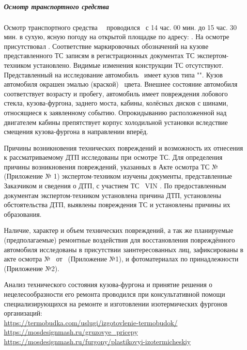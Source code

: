 \subparagraph*{Осмотр транспортного средства }
\noindent \begin{spacing}{1.2} { Осмотр транспортного средства \, \, проводился \osm\, с 14 час. 00 мин. до 15 час. 30 мин. в сухую, ясную погоду  на открытой площадке по адресу: . На осмотре присутствовал  .  %
Соответствие маркировочных обозначений на кузове представленного ТС записям в регистрационных документах ТС экс\-пертом-техником установлено. Видимые изменения конструкции ТС отсутствуют.  Представленный на исследование автомобиль \tc\, имеет кузов типа "". Кузов автомобиля окрашен %
эмалью (краской) \colr\, цвета.  Внешнее состояние автомобиля соответствует возрасту и пробегу, автомобиль имеет повреждения лобового стекла, кузова-фургона, заднего моста, кабины, колёсных дисков с шинами, относящиеся к заявленному событию.  Опрокидыванию расположенной над двигателем кабины  препятствует корпус холодильной установки вследствие смещения кузова-фургона в направлении вперёд.    %
\par Причины возникновения технических повреждений и возможность их отнесения к рассматриваемому ДТП исследованы при осмотре ТС. 
Для определения причины возникновения повреждений, указанных в Акте осмотра ТС 
№ \NomerDoc \, (Приложение № 1) экспертом-техником изучены документы, представленные Заказчиком и сведения о ДТП, с участием ТС  \, VIN  . %
По предоставленным документам экспертом-техником установлена причина ДТП, установлены обстоятельства ДТП, выявлены повреждения ТС и установлены причины их образования. %
\par Наличие, характер и объем технических повреждений, а так же  планируемые (предполагаемые) ремонтные воздействия для восстановления повреждённого автомобиля  исследованы в присутствии заинтересованных лиц, зафиксированы в акте осмотра № \NomerDoc \,  от \osm \, (Приложение №1),  и фотоматериалах по принадлежности (Приложение №2).  }   Анализ технического состояния кузова-фургона и принятие решения о нецелесообразности его ремонта проводился при консультативной помощи специализирующихся  на ремонте и изготовлении изотермических фургонов организаций:\\
\url{https://termobudka.com/uslugi/izgotovlenie-termobudok/} \\
\url{https://mosdesignmash.ru/gruzovye_pricepy}\\
\url{https://mosdesignmash.ru/furgony/plastikovyi-izotermicheskiy}
 

\end{spacing}
